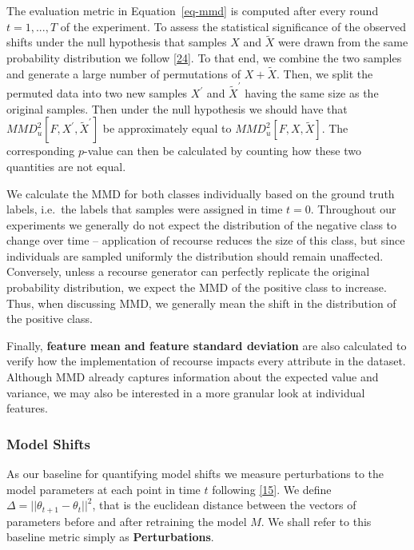 \documentclass[
  conference]{IEEEtran}
\begin{document}
The evaluation metric in Equation~\ref{eq-mmd} is computed after every
round \(t=1,...,T\) of the experiment. To assess the statistical
significance of the observed shifts under the null hypothesis that
samples \(X\) and \(\tilde{X}\) were drawn from the same probability
distribution we follow
\protect\hyperlink{ref-arcones1992bootstrap}{{[}24{]}}. To that end, we
combine the two samples and generate a large number of permutations of
\(X + \tilde{X}\). Then, we split the permuted data into two new samples
\(X^\prime\) and \(\tilde{X}^\prime\) having the same size as the
original samples. Then under the null hypothesis we should have that
\(MMD_u^2[F,X^\prime,\tilde{X}^\prime]\) be approximately equal to
\(MMD_u^2[F,X,\tilde{X}]\). The corresponding \(p\)-value can then be
calculated by counting how these two quantities are not equal.

We calculate the MMD for both classes individually based on the ground
truth labels, i.e.~the labels that samples were assigned in time
\(t=0\). Throughout our experiments we generally do not expect the
distribution of the negative class to change over time -- application of
recourse reduces the size of this class, but since individuals are
sampled uniformly the distribution should remain unaffected. Conversely,
unless a recourse generator can perfectly replicate the original
probability distribution, we expect the MMD of the positive class to
increase. Thus, when discussing MMD, we generally mean the shift in the
distribution of the positive class.

Finally, \textbf{feature mean and feature standard deviation} are also
calculated to verify how the implementation of recourse impacts every
attribute in the dataset. Although MMD already captures information
about the expected value and variance, we may also be interested in a
more granular look at individual features.

\hypertarget{model-shifts}{%
\subsubsection{Model Shifts}\label{model-shifts}}

As our baseline for quantifying model shifts we measure perturbations to
the model parameters at each point in time \(t\) following
\protect\hyperlink{ref-upadhyay2021towards}{{[}15{]}}. We define
\(\Delta=||\theta_{t+1}-\theta_{t}||^2\), that is the euclidean distance
between the vectors of parameters before and after retraining the model
\(M\). We shall refer to this baseline metric simply as
\textbf{Perturbations}.
\end{document}
